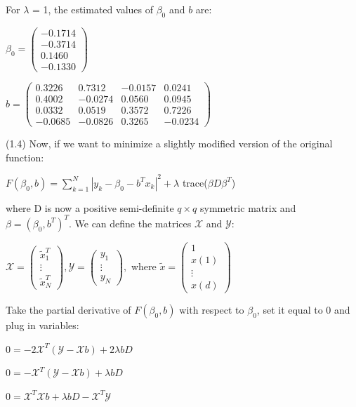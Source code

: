 For $\lambda$ = 1, the estimated values of $\beta_{0}$ and $b$ are:
\begin{center}
$\beta_{0} = 
\begin{pmatrix}
-0.1714 \\
-0.3714 \\
0.1460 \\
-0.1330
\end{pmatrix}$

$b = 
\begin{pmatrix}
 0.3226 &  0.7312 & -0.0157 &  0.0241 \\
 0.4002 & -0.0274 &  0.0560 &  0.0945 \\
 0.0332 &  0.0519 &  0.3572 &  0.7226 \\
-0.0685 & -0.0826 &  0.3265 & -0.0234
\end{pmatrix}$
\end{center}
\vspace{5mm}
(1.4) Now, if we want to minimize a slightly modified version of the original function:
\begin{center}
    $F(\beta_{0}, b) = \sum\limits_{k=1}^N|y_{k} - \beta_{0} - b^{T}x_{k}|^{2} + \lambda$ trace($\beta D\beta^{T}$)
\end{center}
where D is now a positive semi-definite $q \times q$ symmetric matrix and $\beta = (\beta_{0}, b^{T})^{T}$. We can define the matrices $\mathcal{X}$ and $\mathcal{Y}$:
\begin{center}
$\mathcal{X} = 
\begin{pmatrix}
\tilde{x}_{1}^{T} \\
\vdots \\
\tilde{x}_{N}^{T}
\end{pmatrix}
,
\mathcal{Y} = 
\begin{pmatrix}
y_{1} \\
\vdots \\
y_{N}
\end{pmatrix}
,$ where 
$\tilde{x} = 
\begin{pmatrix}
1 \\
x(1) \\
\vdots \\
x(d)
\end{pmatrix}$
\end{center}
Take the partial derivative of $F(\beta_{0}, b)$ with respect to $\beta_{0}$, set it equal to 0 and plug in variables:
\begin{center}
    $0 = -2\mathcal{X}^{T}(\mathcal{Y}- \mathcal{X}b) + 2\lambda bD$
    
    $0 = -\mathcal{X}^{T}(\mathcal{Y}- \mathcal{X}b) + \lambda bD$
    
    $0 = \mathcal{X}^{T}\mathcal{X}b + \lambda bD - \mathcal{X}^{T}\mathcal{Y}$
\end{center}
